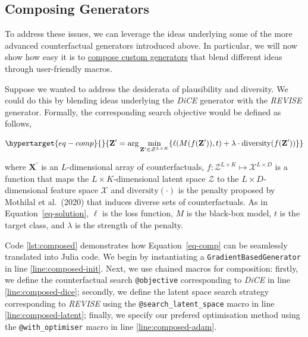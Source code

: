 \documentclass[
  letterpaper,
  DIV=11,
  numbers=noendperiod]{scrartcl}
\begin{document}
\hypertarget{sec-gen-comp}{%
\subsection{Composing Generators}\label{sec-gen-comp}}

To address these issues, we can leverage the ideas underlying some of
the more advanced counterfactual generators introduced above. In
particular, we will now show how easy it is to
\href{https://juliatrustworthyai.github.io/CounterfactualExplanations.jl/v0.1/tutorials/generators/}{compose
custom generators} that blend different ideas through user-friendly
macros.

Suppose we wanted to address the desiderata of plausibility and
diversity. We could do this by blending ideas underlying the \emph{DiCE}
generator with the \emph{REVISE} generator. Formally, the corresponding
search objective would be defined as follows,

\begin{equation}\protect\hypertarget{eq-comp}{}{
\mathbf{Z}^\prime = \arg \min_{\mathbf{Z}^\prime \in \mathcal{Z}^{L \times K}} \{  {\ell(M(f(\mathbf{Z}^\prime)),t)} + \lambda \cdot {\text{diversity}(f(\mathbf{Z}^\prime)) }  \} 
}\label{eq-comp}\end{equation}

where \(\mathbf{X}^\prime\) is an \(L\)-dimensional array of
counterfactuals,
\(f: \mathcal{Z}^{L \times K} \mapsto \mathcal{X}^{L \times D}\) is a
function that maps the \(L \times K\)-dimensional latent space
\(\mathcal{Z}\) to the \(L \times D\)-dimensional feature space
\(\mathcal{X}\) and \(\text{diversity}(\cdot)\) is the penalty proposed
by Mothilal et al.~(2020) \cite{mothilal2020explaining} that induces
diverse sets of counterfactuals. As in Equation~\ref{eq-solution},
\(\ell\) is the loss function, \(M\) is the black-box model, \(t\) is
the target class, and \(\lambda\) is the strength of the penalty.

Code \ref{lst:composed} demonstrates how Equation~\ref{eq-comp} can be
seamlessly translated into Julia code. We begin by instantiating a
\texttt{GradientBasedGenerator} in line \ref{line:composed-init}. Next,
we use chained macros for composition: firstly, we define the
counterfactual search \texttt{@objective} corresponding to \emph{DiCE}
in line \ref{line:composed-dice}; secondly, we define the latent space
search strategy corresponding to \emph{REVISE} using the
\texttt{@search\_latent\_space} macro in line
\ref{line:composed-latent}; finally, we specify our prefered
optimisation method using the \texttt{@with\_optimiser} macro in line
\ref{line:composed-adam}.
\end{document}
